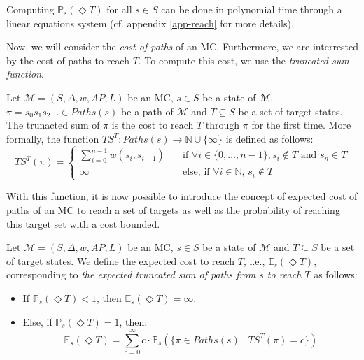 \begin{theorem}
Computing $\mathbb{P}_s(\Diamond T)$ for all $s \in S$ can be done in polynomial
time through a linear equations system (cf. appendix \ref{app-reach} for more details).
\end{theorem}


Now, we will consider the \textit{cost of paths} of an MC. Furthermore, we
are interrested by the cost of paths to reach $T$. To compute this cost, we use the \textit{truncated sum function}.

\begin{definition}
  Let $\mathcal{M}=(S, \Delta, w, AP, L)$ be an MC, $s \in S$ be a state of $\mathcal{M}$, $\pi = s_0s_1s_2\dots \in Paths(s)$ be a path of $\mathcal{M}$ and $T \subseteq S$ be a set of target states.
  The trunacted sum of $\pi$ is the cost to reach $T$ through $\pi$
  for the first time. More formally, the function $TS^T: Paths(s) \rightarrow \mathbb{N} \cup \{\infty\}$ is defined as follows:
	\[
		TS^T(\pi) =
		\begin{cases}
			\sum_{i = 0}^{n-1} w(s_i, s_{i+1}) & \quad \text{if } \forall i \in \{0, \dots, n - 1\}, s_i \not\in T \text{ and } s_n \in T \\
			\infty & \quad \text{else, if } \forall i \in \mathbb{N}, \, s_i \notin T
		\end{cases}
	\]
\end{definition}
With this function, it is now possible to introduce the concept of
expected cost of paths of an MC to reach a set of targets as well as
the probability of reaching this target set with a cost bounded.

\begin{definition}
	Let $\mathcal{M} = (S, \Delta, w, AP, L)$ be an MC, $s \in S$ be a state of $\mathcal{M}$ and $T \subseteq S$ be a set of target states. We define the expected cost to reach $T$, i.e., $\mathbb{E}_s(\Diamond T)$, corresponding to \textit{the expected truncated sum of paths from $s$ to reach $T$} as follows:
	\begin{itemize}
	\renewcommand{\labelitemi}{\tiny$\bullet$}
	\item If $\mathbb{P}_s(\Diamond T) < 1$, then $\mathbb{E}_s(\Diamond T) = \infty$.%
	\item Else, if $\mathbb{P}_s(\Diamond T) = 1$, then:
	\[
    \mathbb{E}_s(\Diamond T) = \sum_{c = 0}^\infty c \cdot \mathbb{P}_s(\{\pi \in Paths(s) \; | \; TS^T(\pi) = c \})
  \]
	\end{itemize}
\end{definition}

